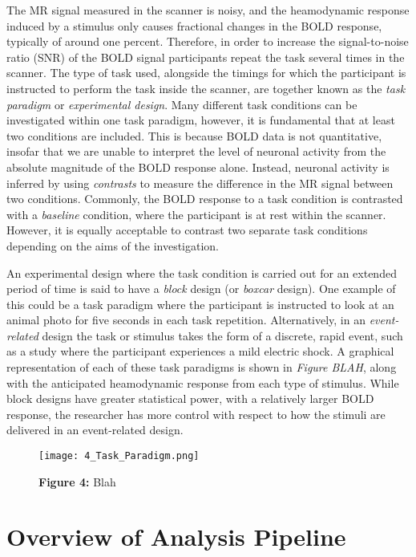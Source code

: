The MR signal measured in the scanner is noisy, and the heamodynamic response induced by a stimulus only causes fractional changes in the BOLD response, typically of around one percent. Therefore, in order to increase the signal-to-noise ratio (SNR) of the BOLD signal participants repeat the task several times in the scanner. The type of task used, alongside the timings for which the participant is instructed to perform the task inside the scanner, are together known as the \textit{task paradigm} or \textit{experimental design}. Many different task conditions can be investigated within one task paradigm, however, it is fundamental that at least two conditions are included. This is because BOLD data is not quantitative, insofar that we are unable to interpret the level of neuronal activity from the absolute magnitude of the BOLD response alone. Instead, neuronal activity is inferred by using \textit{contrasts} to measure the difference in the MR signal between two conditions. Commonly, the BOLD response to a task condition is contrasted with a \textit{baseline} condition, where the participant is at rest within the scanner. However, it is equally acceptable to contrast two separate task conditions depending on the aims of the investigation. 

An experimental design where the task condition is carried out for an extended period of time is said to have a \textit{block} design (or \textit{boxcar} design). One example of this could be a task paradigm where the participant is instructed to look at an animal photo for five seconds in each task repetition. Alternatively, in an \textit{event-related} design the task or stimulus takes the form of a discrete, rapid event, such as a study where the participant experiences a mild electric shock. A graphical representation of each of these task paradigms is shown in \textit{Figure BLAH}, along with the anticipated heamodynamic response from each type of stimulus. While block designs have greater statistical power, with a relatively larger BOLD response, the researcher has more control with respect to how the stimuli are delivered in an event-related design. 

\begin{figure}[htbp]
\centering
	\texttt{[image: 4\_Task\_Paradigm.png]}
\caption*{\textbf{Figure 4:} Blah}
\end{figure}

\section{Overview of Analysis Pipeline}

